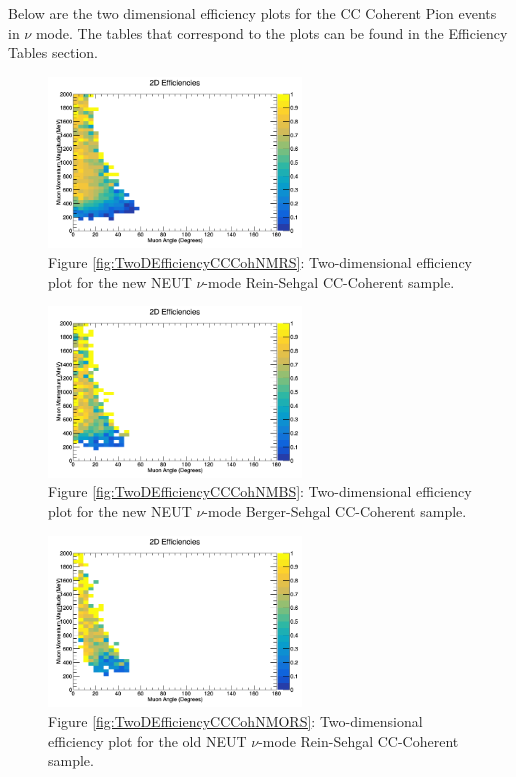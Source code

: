 \documentclass[11pt]{article}
\begin{document}
Below are the two dimensional efficiency plots for the CC Coherent Pion events in $\nu$ mode. The tables that correspond to the plots can be found in the Efficiency Tables section.

\begin{figure}[H]
\centering
\includegraphics[width=0.6\textwidth]{CCCohPlots/2DEffNMRS.png}
\caption*{Figure \ref*{fig:TwoDEfficiencyCCCohNMRS}: Two-dimensional efficiency plot for the new NEUT $\nu$-mode Rein-Sehgal CC-Coherent sample.}
\end{figure}\label{fig:TwoDEfficiencyCCCohNMRS}

\begin{figure}[H]
\centering
\includegraphics[width=0.6\textwidth]{CCCohPlots/2DEffNMBS.png}
\caption*{Figure \ref*{fig:TwoDEfficiencyCCCohNMBS}: Two-dimensional efficiency plot for the new NEUT $\nu$-mode Berger-Sehgal CC-Coherent sample.}
\end{figure}\label{fig:TwoDEfficiencyCCCohNMBS}

\begin{figure}[H]
\centering
\includegraphics[width=0.6\textwidth]{CCCohPlots/2DEffNMORS.png}
\caption*{Figure \ref*{fig:TwoDEfficiencyCCCohNMORS}: Two-dimensional efficiency plot for the old NEUT $\nu$-mode Rein-Sehgal CC-Coherent sample.}
\end{figure}\label{fig:TwoDEfficiencyCCCohNMORS}
\end{document}
